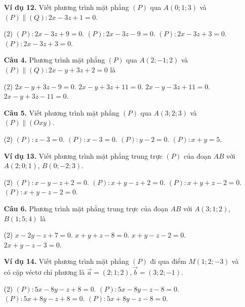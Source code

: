 \documentclass[12pt, a4paper]{article}
\renewcommand{\vec}[1]{\overrightarrow{#1}}
\begin{document}
\begin{enumerate}[label=\textbf{\arabic*.}, wide=0pt, leftmargin=*]

    \item[\textbf{Ví dụ 12.}] Viết phương trình mặt phẳng \((P)\) qua \(A(0;1;3)\) và \((P) \parallel (Q) : 2x - 3z + 1 = 0\).
    \begin{tasks}(2)
        \task \((P): 2x - 3z + 9 = 0\).
        \task \((P): 2x - 3z - 9 = 0\).
        \task \((P): 2x - 3z + 3 = 0\).
        \task \((P): 2x - 3z + 3 = 0\).
    \end{tasks}
    
    \item[\textbf{Câu 4.}] Phương trình mặt phẳng \((P)\) qua \(A(2;-1;2)\) và \((P) \parallel (Q) : 2x - y + 3z + 2 = 0\) là
    \begin{tasks}(2)
        \task \(2x - y + 3z - 9 = 0\).
        \task \(2x - y + 3z + 11 = 0\).
        \task \(2x - y - 3z + 11 = 0\).
        \task \(2x - y + 3z - 11 = 0\).
    \end{tasks}
    
    \item[\textbf{Câu 5.}] Viết phương trình mặt phẳng \((P)\) qua \(A(3;2;3)\) và \((P) \parallel (Oxy)\).
    \begin{tasks}(2)
        \task \((P): z - 3 = 0\).
        \task \((P): x - 3 = 0\).
        \task \((P): y - 2 = 0\).
        \task \((P): x + y = 5\).
    \end{tasks}
    
    \item[\textbf{Ví dụ 13.}] Viết phương trình mặt phẳng trung trực \((P)\) của đoạn \(AB\) với \(A(2;0;1)\), \(B(0;-2;3)\).
    \begin{tasks}(2)
        \task \((P): x - y - z + 2 = 0\).
        \task \((P): x + y - z + 2 = 0\).
        \task \((P): x + y + z - 2 = 0\).
        \task \((P): x + y - z - 2 = 0\).
    \end{tasks}

    \item[\textbf{Câu 6.}] Phương trình mặt phẳng trung trực của đoạn \(AB\) với \(A(3;1;2)\), \(B(1;5;4)\) là
    \begin{tasks}(2)
        \task \(x - 2y - z + 7 = 0\).
        \task \(x + y + z - 8 = 0\).
        \task \(x + y - z - 2 = 0\).
        \task \(2x + y - z - 3 = 0\).
    \end{tasks}

    \item[\textbf{Ví dụ 14.}] Viết phương trình mặt phẳng \((P)\) đi qua điểm \(M(1;2;-3)\) và có cặp véctơ chỉ phương là \(\vec{a}=(2;1;2), \vec{b}=(3;2;-1)\).
    \begin{tasks}(2)
        \task \((P): 5x - 8y - z + 8 = 0\).
        \task \((P): 5x - 8y - z - 8 = 0\).
        \task \((P): 5x + 8y - z + 8 = 0\).
        \task \((P): 5x + 8y - z - 8 = 0\).
    \end{tasks}
    

\end{enumerate}
\end{document}
